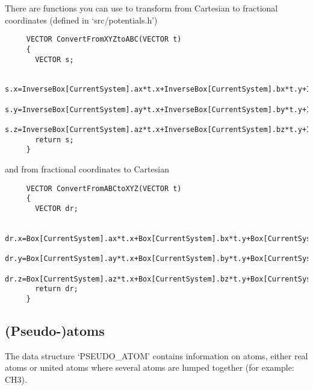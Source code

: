 \noindent
There are functions you can use to transform from Cartesian to fractional coordinates (defined in `src/potentials.h')
\begin{footnotesize}
\begin{verbatim}
     VECTOR ConvertFromXYZtoABC(VECTOR t)
     {
       VECTOR s;

       s.x=InverseBox[CurrentSystem].ax*t.x+InverseBox[CurrentSystem].bx*t.y+InverseBox[CurrentSystem].cx*t.z;
       s.y=InverseBox[CurrentSystem].ay*t.x+InverseBox[CurrentSystem].by*t.y+InverseBox[CurrentSystem].cy*t.z;
       s.z=InverseBox[CurrentSystem].az*t.x+InverseBox[CurrentSystem].bz*t.y+InverseBox[CurrentSystem].cz*t.z;
       return s;
     }
\end{verbatim}
\end{footnotesize}
and from fractional coordinates to Cartesian
\begin{footnotesize}
\begin{verbatim}
     VECTOR ConvertFromABCtoXYZ(VECTOR t)
     {
       VECTOR dr;

       dr.x=Box[CurrentSystem].ax*t.x+Box[CurrentSystem].bx*t.y+Box[CurrentSystem].cx*t.z;
       dr.y=Box[CurrentSystem].ay*t.x+Box[CurrentSystem].by*t.y+Box[CurrentSystem].cy*t.z;
       dr.z=Box[CurrentSystem].az*t.x+Box[CurrentSystem].bz*t.y+Box[CurrentSystem].cz*t.z;
       return dr;
     }
\end{verbatim}
\end{footnotesize}

\subsection*{(Pseudo-)atoms}

The data structure `PSEUDO\_ATOM' contains information on atoms, either real atoms or united atoms where several atoms are lumped together (for example: CH3).


